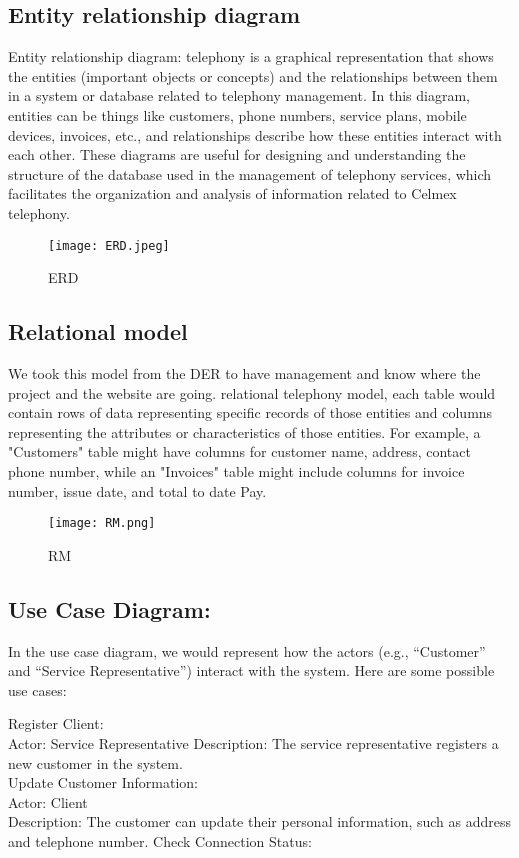 \documentclass[journal]{IEEEtran}
\begin{document}
\subsection{Entity relationship diagram}
Entity relationship diagram: telephony is a graphical representation that shows the entities (important objects or concepts) and the relationships between them in a system or database related to telephony management. In this diagram, entities can be things like customers, phone numbers, service plans, mobile devices, invoices, etc., and relationships describe how these entities interact with each other. These diagrams are useful for designing and understanding the structure of the database used in the management of telephony services, which facilitates the organization and analysis of information related to Celmex telephony. 

\begin{figure}[h]
    \centering
 \texttt{[image: ERD.jpeg]}
    \caption{ERD}
    \label{fig:ejemplo}
\end{figure}

\subsection{Relational model}
We took this model from the DER to have management and know where the project and the website are going. relational telephony model, each table would contain rows of data representing specific records of those entities and columns representing the attributes or characteristics of those entities. For example, a "Customers" table might have columns for customer name, address, contact phone number, while an "Invoices" table might include columns for invoice number, issue date, and total to date Pay.

\begin{figure}[h]
    \centering
 \texttt{[image: RM.png]}
    \caption{RM}
    \label{fig:ejemplo}
\end{figure}

\subsection{Use Case Diagram: }
In the use case diagram, we would represent how the actors (e.g., “Customer” and “Service Representative”) interact with the system. Here are some possible use cases: 
 
Register Client: \\
Actor: Service Representative Description: The service representative registers a new customer in the system. \\
Update Customer Information: \\
Actor: Client \\
Description: The customer can update their personal information, such as address and telephone number. Check Connection Status:\\
\end{document}
